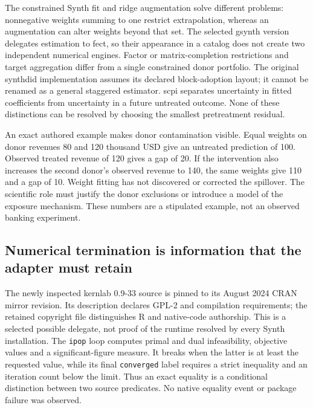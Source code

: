The constrained Synth fit and ridge augmentation solve different problems:
nonnegative weights summing to one restrict extrapolation, whereas an
augmentation can alter weights beyond that set. The selected gsynth version
delegates estimation to fect, so their appearance in a catalog does not create
two independent numerical engines. Factor or matrix-completion restrictions
and target aggregation differ from a single constrained donor portfolio.
The original synthdid implementation assumes its declared block-adoption
layout; it cannot be renamed as a general staggered estimator. scpi separates
uncertainty in fitted coefficients from uncertainty in a future untreated
outcome. None of these distinctions can be resolved by choosing the smallest
pretreatment residual.~\citep{exec24_synth_source,exec24_augsynth_source,
exec21_gsynth_wrapper,exec24_fect_source,exec23_synthdid_reuse_source,
exec24_scpi_source}

An exact authored example makes donor contamination visible. Equal weights
on donor revenues 80 and 120 thousand USD give an untreated prediction of
100. Observed treated revenue of 120 gives a gap of 20. If the intervention
also increases the second donor's observed revenue to 140, the same weights
give 110 and a gap of 10. Weight fitting has not discovered or corrected the
spillover. The scientific role must justify the donor exclusions or introduce
a model of the exposure mechanism. These numbers are a stipulated example,
not an observed banking experiment.~\citep{exec25_synthr_choice}

\subsection{Numerical termination is information that the adapter must retain}
The newly inspected kernlab 0.9-33 source is pinned to its August 2024 CRAN
mirror revision. Its description declares GPL-2 and compilation requirements;
the retained copyright file distinguishes R and native-code authorship. This
is a selected possible delegate, not proof of the runtime resolved by every
Synth installation. The \texttt{ipop} loop computes primal and dual
infeasibility, objective values and a significant-figure measure. It breaks
when the latter is at least the requested value, while its final
\texttt{converged} label requires a strict inequality and an iteration count
below the limit. Thus an exact equality is a conditional distinction between
two source predicates. No native equality event or package failure was
observed.~\citep{exec25_synthr_kernlab}

